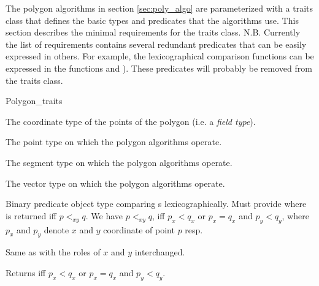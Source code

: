 The polygon algorithms in section \ref{sec:poly_algo} are parameterized with
a traits class  that defines the basic types and predicates
that the algorithms use. This section describes the minimal requirements for
the traits class. N.B. Currently the list of requirements contains several
redundant predicates that can be easily expressed in others. For example,
the lexicographical comparison functions can be expressed in the functions
 and ). These predicates will probably
be removed from the traits class.

\begin{ccClass} {Polygon_traits}
{}

\ccTypes
{}
        {The coordinate type of the points of the polygon (i.e. a {\em field type}).}

\ccGlue
{}
        {The point type on which the polygon algorithms operate.}

\ccGlue
{}
        {The segment type on which the polygon algorithms operate.}

\ccGlue
{}
        {The vector type on which the polygon algorithms operate.}

\ccGlue
{}
       {Binary predicate object type comparing s lexicographically.
        Must provide  where 
        is returned iff $p <_{xy} q$.
        We have $p<_{xy}q$, iff $p_x < q_x$ or $p_x = q_x$ and $p_y < q_y$,
        where $p_x$ and $p_y$ denote $x$ and $y$ coordinate of point $p$ resp.
       }

\ccGlue
{}
       {Same as  with the roles of $x$ and $y$ interchanged.}

\ccCreation
{}


\ccGlue
{}

\ccOperations
{}

{
Returns  iff $p_x < q_x$ or $p_x = q_x$ and $p_y < q_y$.
}


\end{ccClass}

